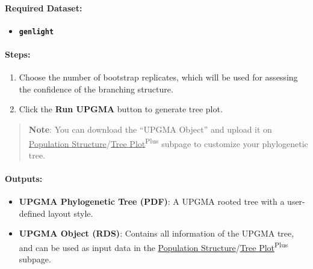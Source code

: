 \documentclass[
]{book}
\providecommand{\tightlist}{%
  \setlength{\itemsep}{0pt}\setlength{\parskip}{0pt}}
\begin{document}
\paragraph*{Required Dataset:}\label{required-dataset-3}

\begin{itemize}
\tightlist
\item
  {\textbf{\texttt{genlight}}}
\end{itemize}

\paragraph*{\texorpdfstring{\textbf{Steps}:}{Steps:}}\label{steps-1}

\begin{enumerate}
\def\labelenumi{\arabic{enumi}.}
\item
  Choose the number of bootstrap replicates, which will be used for assessing the confidence of the branching structure.
\item
  Click the {\textbf{Run UPGMA}} button to generate tree plot.
\end{enumerate}

\begin{quote}
\textbf{Note}: You can download the ``UPGMA Object'' and upload it on \ul{Population Structure}/\ul{Tree Plot}\textsuperscript{Plus} subpage to customize your phylogenetic tree.
\end{quote}

\paragraph*{Outputs:}\label{outputs-7}

\begin{itemize}
\item
  \textbf{UPGMA Phylogenetic Tree (PDF)}: A UPGMA rooted tree with a user-defined layout style.
\item
  \textbf{UPGMA Object (RDS)}: Contains all information of the UPGMA tree, and can be used as input data in the \ul{Population Structure}/\ul{Tree Plot}\textsuperscript{Plus} subpage.
\end{itemize}
\end{document}
